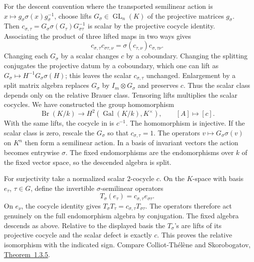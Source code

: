 \begin{remark}
For the descent convention where the transported semilinear
action is \(x\mapsto g_\sigma \sigma(x)g_\sigma^{-1}\),
choose lifts \(G_\sigma\in\operatorname{GL}_n(K)\) of the
projective matrices \(g_\sigma\). Then
\(c_{\sigma,\tau}=G_\sigma\sigma(G_\tau)G_{\sigma\tau}^{-1}\)
is scalar by the projective cocycle identity. Associating the
product of three lifted maps in two ways gives
\[
 c_{\sigma,\tau}c_{\sigma\tau,\nu}
 =\sigma(c_{\tau,\nu})c_{\sigma,\tau\nu}.
\]
Changing each \(G_\sigma\) by a scalar changes \(c\) by a
coboundary. Changing the splitting conjugates the projective
datum by a coboundary, which one can lift as
\(G_\sigma\mapsto H^{-1}G_\sigma\sigma(H)\); this leaves the
scalar \(c_{\sigma,\tau}\) unchanged. Enlargement by a
split matrix algebra replaces \(G_\sigma\) by \(I_m\otimes G_\sigma\)
and preserves \(c\). Thus the scalar class depends only
on the relative Brauer class. Tensoring lifts multiplies
the scalar cocycles. We have constructed the group homomorphism
\[
 \operatorname{Br}(K/k)\longrightarrow
 H^2(\operatorname{Gal}(K/k),K^\times),\qquad [A]\longmapsto[c].
\]
With the same lifts, the cocycle in
\cite[Equation~(59.61.5.1)]{stacksdescent} is \(c^{-1}\).
The homomorphism is injective. If the scalar class is zero,
rescale the \(G_\sigma\) so that \(c_{\sigma,\tau}=1\).
The operators \(v\mapsto G_\sigma\sigma(v)\) on \(K^n\) then
form a semilinear action. In a basis of invariant vectors the
action becomes entrywise \(\sigma\). The fixed endomorphisms
are the endomorphisms over \(k\) of the fixed vector space,
so the descended algebra is split.

For surjectivity take a normalized scalar \(2\)-cocycle \(c\).
On the \(K\)-space with basis \(e_\tau\), \(\tau\in G\), define
the invertible \(\sigma\)-semilinear operators
\[
 T_\sigma(e_\tau)=c_{\sigma,\tau}e_{\sigma\tau}.
\]
On \(e_\nu\), the cocycle identity gives
\(T_\sigma T_\tau=c_{\sigma,\tau}T_{\sigma\tau}\).
The operators therefore act genuinely on the full endomorphism
algebra by conjugation. The fixed algebra descends as above.
Relative to the displayed basis the \(T_\sigma\)'s are lifts
of its projective cocycle and the scalar defect is exactly \(c\).
This proves the relative isomorphism with the indicated sign.
Compare Colliot-Th\'el\`ene and Skorobogatov,
\href{https://www.imo.universite-paris-saclay.fr/~jean-louis.colliot-thelene/BGgroup_book.pdf}{Theorem~1.3.5}.


\end{remark}
